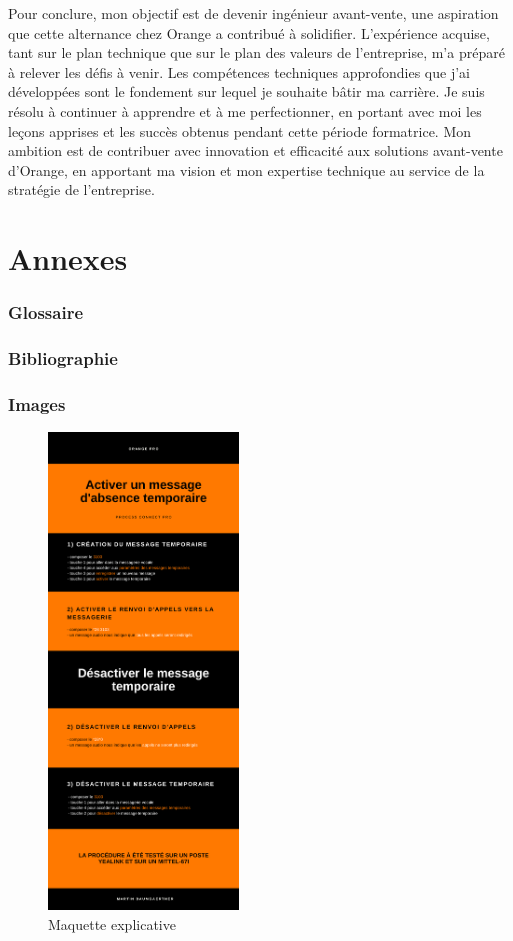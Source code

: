 \documentclass[12pt, a4paper]{article}
\begin{document}
Pour conclure, mon objectif est de devenir ingénieur avant-vente,
une aspiration que cette alternance chez Orange a contribué à solidifier.
L'expérience acquise, tant sur le plan technique que sur le plan des valeurs
de l'entreprise, m'a préparé à relever les défis à venir. Les compétences
techniques approfondies que j'ai développées sont le fondement sur lequel
je souhaite bâtir ma carrière. Je suis résolu à continuer à apprendre et à
me perfectionner, en portant avec moi les leçons apprises et les succès
obtenus pendant cette période formatrice. Mon ambition est de contribuer
avec innovation et efficacité aux solutions avant-vente d'Orange, en
apportant ma vision et mon expertise technique au service de la stratégie
de l'entreprise.
\newpage
\pagestyle{empty}
\appendix
\part{\Large{Annexes}}
\newpage
\parttoc 


\newpage
\pagestyle{fancy}
\glsaddall

\section{Glossaire}
\begingroup
\renewcommand{\addcontentsline}[3]{}
\printglossary[type=\acronymtype, title=Acronymes]
\endgroup

\newpage
\section{Bibliographie}



\newpage
\section{Images}
\begin{figure}[h]
	\centering
	\includegraphics[width=0.45\textwidth]{img/maquette.png}
	\caption{Maquette explicative}
\end{figure}
\end{document}
